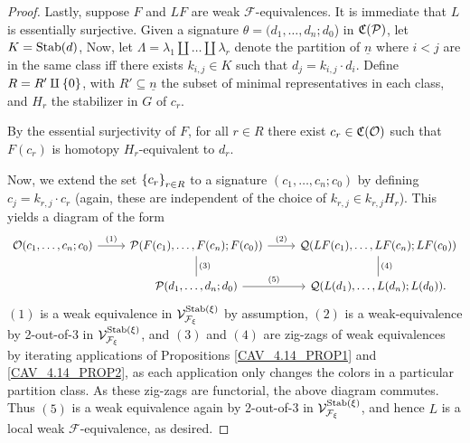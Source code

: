 \documentclass[a4paper,10pt
,draft
]{article}%
\renewcommand{\F}{\mathcal F}
\newcommand{\Q}{\mathcal Q}
\renewcommand{\1}{\ensuremath{\mathbb{id}}}
\begin{document}
\begin{proof}
      Lastly, suppose $F$ and $LF$ are weak $\F$-equivalences.
      It is immediate that $L$ is essentially surjective.
      Given a signature $\theta = (d_1,\ldots,d_n;d_0$) in $\mathfrak C(\mathcal{P})$, let $K = \mathrm{Stab}(d)$,
      Now, let $\Lambda = \lambda_1 \amalg \dots \amalg \lambda_r$ denote the partition of $\underline{n}$
      where $i < j$ are in the same class iff there exists $k_{i,j} \in K$ such that $d_j = k_{i,j} \cdot d_i$.
      Define $R  = R' \amalg \left\{0\right\}$, with $R' \subseteq \underline{n}$ the subset of minimal representatives in each class,
      and $H_r$ the stabilizer in $G$ of $c_r$.

      By the essential surjectivity of $F$, for all $r \in R$ there exist $c_r \in \mathfrak C(\mathcal{O})$ such that
      $F(c_r)$ is homotopy $H_r$-equivalent to $d_r$.

      Now, we extend the set $\left\{c_r\right\}_{r\in R}$ to a signature $(c_1,\ldots, c_n;c_0)$ by defining $c_j = k_{r,j} \cdot c_r$
      (again, these are independent of the choice of $k_{r,j} \in k_{r,j}H_r$).
      This yields a diagram of the form
      \begin{equation}
            \label{TWOOFTHREE_EQ}
            \begin{tikzcd}
                  \O(c_1,\ldots, c_n;c_0) \arrow[r, "(1)"]
                  &
                  \P(F(c_1),\ldots, F(c_n); F(c_0)) \arrow[d,dash, "(3)"] \arrow[r, "(2)"]
                  &
                  \Q(LF(c_1),\ldots, LF(c_n);LF(c_0)) \arrow[d, dash, "(4)"]
                  \\
                  &
                  \P(d_1,\ldots, d_n;d_0) \arrow[r, "(5)"]
                  &
                  \Q(L(d_1),\ldots, L(d_n); L(d_0)).
            \end{tikzcd}
      \end{equation}
      $(1)$ is a weak equivalence in $\V^{\Stab(\ksi)}_{\F_\ksi}$ by assumption,
      $(2)$ is a weak-equivalence by 2-out-of-3 in $\V^{\Stab(\ksi)}_{\F_\ksi}$, and
      $(3)$ and $(4)$ are zig-zags of weak equivalences by iterating applications of
      Propositions \ref{CAV_4.14_PROP1} and \ref{CAV_4.14_PROP2}, %
      as each application only changes the colors in a particular partition class.
      As these zig-zags are functorial, the above diagram commutes.
      Thus $(5)$ is a weak equivalence again by 2-out-of-3 in $\V^{\Stab(\ksi)}_{\F_\ksi}$, and hence
      $L$ is a local weak $\F$-equivalence, as desired.
\end{proof}
\end{document}
